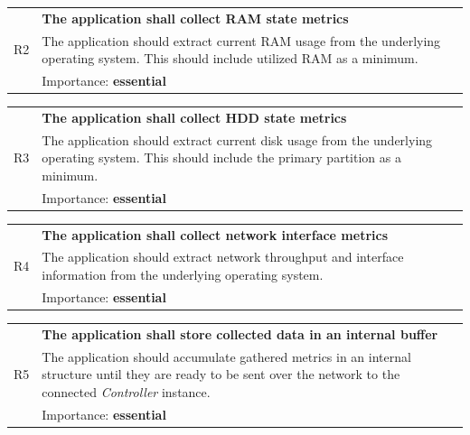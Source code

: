\documentclass[12pt,a4paper,table]{article}
\begin{document}
                \vspace{0.5cm}
                \noindent
                \begin{tabular}{ p{0.7cm}|p{14.5cm} }
                    \multirow{3}{*}{R2 } & \textbf{The application shall collect RAM state metrics}\\
                    \cline{2-2}
                    & The application should extract current RAM usage from the underlying operating system. This should include utilized RAM as a minimum.\\
                    \cline{2-2}
                    & Importance: \textbf{essential}
                \end{tabular}

                \vspace{0.5cm}
                \noindent
                \begin{tabular}{ p{0.7cm}|p{14.5cm} }
                    \multirow{3}{*}{R3 } & \textbf{The application shall collect HDD state metrics}\\
                    \cline{2-2}
                    & The application should extract current disk usage from the underlying operating system. This should include the primary partition as a minimum.\\
                    \cline{2-2}
                    & Importance: \textbf{essential}
                \end{tabular}

                \vspace{0.5cm}
                \noindent
                \begin{tabular}{ p{0.7cm}|p{14.5cm} }
                    \multirow{3}{*}{R4 } & \textbf{The application shall collect network interface metrics}\\
                    \cline{2-2}
                    & The application should extract network throughput and interface information from the underlying operating system.\\
                    \cline{2-2}
                    & Importance: \textbf{essential}
                \end{tabular}

                \vspace{0.5cm}
                \noindent
                \begin{tabular}{ p{0.7cm}|p{14.5cm} }
                    \multirow{3}{*}{R5 } & \textbf{The application shall store collected data in an internal buffer}\\
                    \cline{2-2}
                    & The application should accumulate gathered metrics in an internal structure until they are ready to be sent over the network to the connected \textit{Controller} instance.\\
                    \cline{2-2}
                    & Importance: \textbf{essential}
                \end{tabular}
\end{document}
